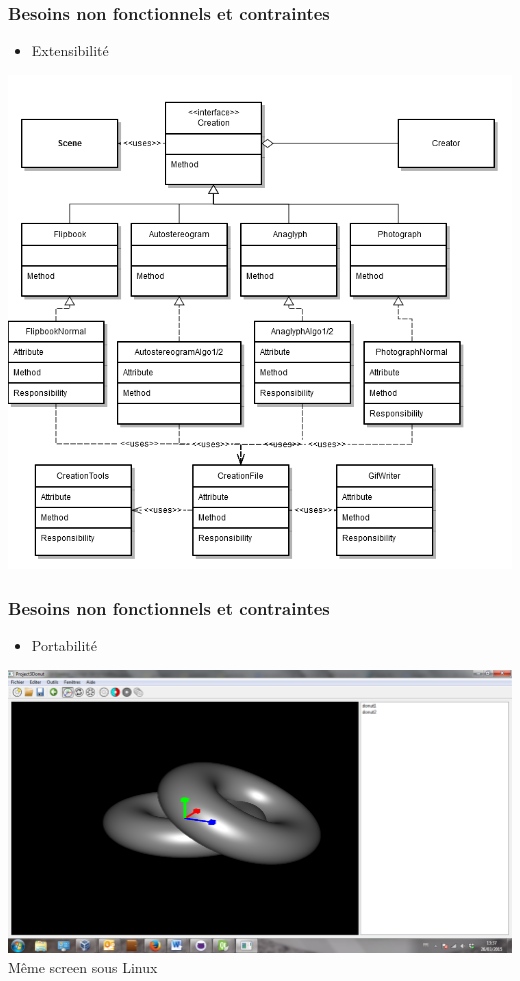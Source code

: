 \documentclass{beamer}
\begin{document}
\begin{frame}
\begin{tabular}{l|c|r}
\end{tabular}
\end{frame}


\begin{frame}
\frametitle{Besoins non fonctionnels et contraintes}
\begin{itemize}[label=$\bullet$]
\item Extensibilité
\end{itemize}
\centering
\includegraphics[scale=0.25]{extensibilite.png}
\end{frame}


\begin{frame}
\frametitle{Besoins non fonctionnels et contraintes}
\begin{itemize}[label=$\bullet$]
\item Portabilité
\end{itemize}
\centering
\includegraphics[scale=0.7]{portabilite.png}
\\
Même screen sous Linux 
\end{frame}
\end{document}
